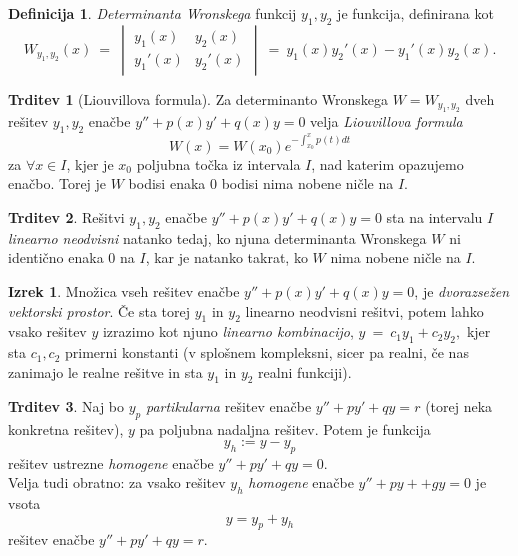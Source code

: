 \documentclass[11pt]{article}
\theoremstyle{definition}
\newtheorem{definicija}{Definicija}[section]
\theoremstyle{definition}
\newtheorem{trditev}{Trditev}[section]
\theoremstyle{definition}
\newtheorem{izrek}{Izrek}[section]
\begin{document}
\begin{definicija}

\textit{Determinanta Wronskega} funkcij $y_1, y_2$ je funkcija, definirana kot
$$W_{y_1,y_2}(x) ~=~ \begin{vmatrix}
y_1(x) & y_2(x) \\
y_1'(x) & y_2'(x)
\end{vmatrix} ~=~ y_1(x) y_2'(x) - y_1'(x) y_2(x).$$

\end{definicija}
\vspace{0.5cm}

\begin{trditev}[Liouvillova formula]

Za determinanto Wronskega $W = W_{y_1,y_2}$ dveh rešitev $y_1, y_2$ enačbe $y'' + p(x) y' + q(x) y = 0$ velja \textit{Liouvillova formula}
$$W(x) = W(x_0) e^{-\int_{x_0}^x p(t) dt}$$
za $\forall x \in I$, kjer je $x_0$ poljubna točka iz intervala $I$, nad katerim opazujemo enačbo. Torej je $W$ bodisi enaka $0$ bodisi nima nobene ničle na $I$.

\end{trditev}
\vspace{0.5cm}

\begin{trditev}

Rešitvi $y_1, y_2$ enačbe $y'' + p(x) y' + q(x) y = 0$ sta na intervalu $I$ \textit{linearno neodvisni} natanko tedaj, ko njuna determinanta Wronskega $W$ ni identično enaka $0$ na $I$, kar je natanko takrat, ko $W$ nima nobene ničle na $I$.

\end{trditev}
\vspace{0.5cm}

\begin{izrek}

Množica vseh rešitev enačbe $y'' + p(x) y' + q(x) y = 0$, je \textit{dvorazsežen vektorski prostor}. Če sta torej $y_1$ in $y_2$ linearno neodvisni rešitvi, potem lahko vsako rešitev $y$ izrazimo kot njuno \textit{linearno kombinacijo}, 
$y ~=~ c_1 y_1 + c_2 y_2,$
kjer sta $c_1, c_2$ primerni konstanti (v splošnem kompleksni, sicer pa realni, če nas zanimajo le realne rešitve in sta $y_1$ in $y_2$ realni funkciji).

\end{izrek}
\vspace{0.5cm}

\begin{trditev}

Naj bo $y_p$ \textit{partikularna} rešitev enačbe $y'' + p y' + q y = r$ (torej neka konkretna rešitev), $y$ pa poljubna nadaljna rešitev. Potem je funkcija
$$y_h := y - y_p$$
rešitev ustrezne \textit{homogene} enačbe $y'' + p y' + q y = 0$. \\
\noindent Velja tudi obratno: za vsako rešitev $y_h$ \textit{homogene} enačbe $y'' + p y+ + g y = 0$ je vsota
$$y = y_p + y_h$$
rešitev enačbe $y'' + p y' + q y = r$.

\end{trditev}
\vspace{0.5cm}
\end{document}
